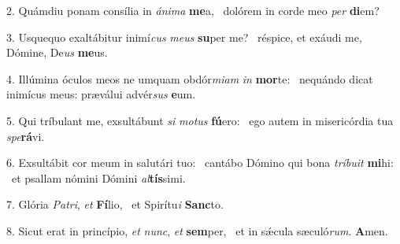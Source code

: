 2. Quámdiu ponam consília in \textit{á}\textit{ni}\textit{ma} \textbf{me}a, \ast\  dolórem in corde meo \textit{per} \textbf{di}em?\

3. Usquequo exaltábitur inimí\textit{cus} \textit{me}\textit{us} \textbf{su}per me? \ast\  réspice, et exáudi me, Dómine, De\textit{us} \textbf{me}us.\

4. Illúmina óculos meos ne umquam obdór\textit{mi}\textit{am} \textit{in} \textbf{mor}te: \ast\  nequándo dicat inimícus meus: præválui advér\textit{sus} \textbf{e}um.\

5. Qui tríbulant me, exsultábunt \textit{si} \textit{mo}\textit{tus} \textbf{fú}ero: \ast\  ego autem in misericórdia tua \textit{spe}\textbf{rá}vi.\

6. Exsultábit cor meum in salutári tuo: \dag\  cantábo Dómino qui bona \textit{trí}\textit{bu}\textit{it} \textbf{mi}hi: \ast\  et psallam nómini Dómini \textit{al}\textbf{tís}simi.\

7. Glória \textit{Pa}\textit{tri}, \textit{et} \textbf{Fí}lio, \ast\  et Spirítu\textit{i} \textbf{Sanc}to.\

8. Sicut erat in princípio, \textit{et} \textit{nunc}, \textit{et} \textbf{sem}per, \ast\  et in sǽcula sæculó\textit{rum}. \textbf{A}men.\

